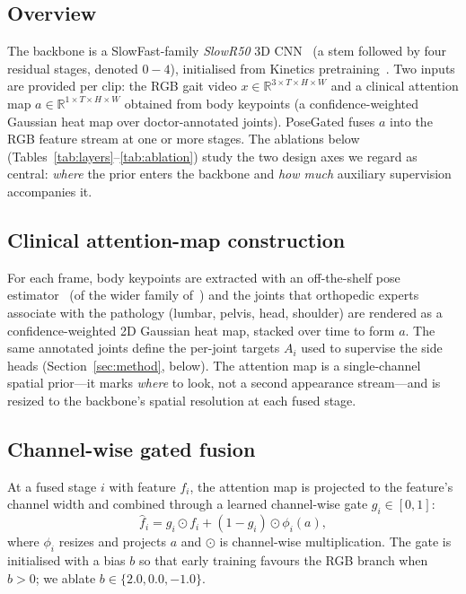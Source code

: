 \documentclass[review,authoryear,times]{elsarticle}
\begin{document}
\subsection{Overview}
The backbone is a SlowFast-family \emph{SlowR50} 3D
CNN~\citep{feichtenhofer2019slowfast,he2016resnet} (a stem followed by four
residual stages, denoted $0\!-\!4$), initialised from {Kinetics}
pretraining~\citep{kay2017kinetics}. Two inputs are provided per clip: the RGB
gait video $x\in\mathbb{R}^{3\times T\times H\times W}$ and a clinical attention
map $a\in\mathbb{R}^{1\times T\times H\times W}$ obtained from body keypoints (a
confidence-weighted Gaussian heat map over doctor-annotated joints). PoseGated
fuses $a$ into the RGB feature stream at one or more stages. The ablations below
(Tables~\ref{tab:layers}--\ref{tab:ablation}) study the two design axes we regard
as central: \emph{where} the prior enters the backbone and \emph{how much}
auxiliary supervision accompanies it.

\subsection{Clinical attention-map construction}
For each frame, body keypoints are extracted with an off-the-shelf pose
estimator~\citep{jocher2023yolov8} (of the wider family
of~\citealp{cao2017openpose,sun2019hrnet}) and the joints that orthopedic
experts associate with the pathology (lumbar, pelvis, head, shoulder) are
rendered as a confidence-weighted {2D} Gaussian heat map, stacked over time to
form $a$. The same annotated joints define the per-joint targets $A_i$ used to
supervise the side heads (Section~\ref{sec:method}, below). The attention map is
a single-channel spatial prior---it marks \emph{where} to look, not a second
appearance stream---and is resized to the backbone's spatial resolution at each
fused stage.

\subsection{Channel-wise gated fusion}
At a fused stage $i$ with feature $f_i$, the attention map is projected to the
feature's channel width and combined through a learned channel-wise gate
$g_i\in[0,1]$:
\begin{equation}
\hat f_i = g_i \odot f_i + (1-g_i)\odot \phi_i(a),
\end{equation}
where $\phi_i$ resizes and projects $a$ and $\odot$ is channel-wise
multiplication. The gate is initialised with a bias $b$ so that early training
favours the RGB branch when $b>0$; we ablate $b\in\{2.0,0.0,-1.0\}$.
\end{document}

